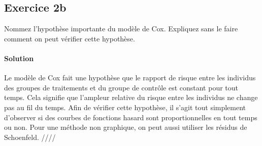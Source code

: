 \documentclass[../main.tex]{subfiles}
\begin{document}
\begin{CJK*}{UTF8}{gbsn}
    
\section*{Exercice 2b}
Nommez l'hypothèse importante du modèle de Cox. 
Expliquez sans le faire comment on peut vérifier cette hypothèse.
    
\paragraph{Solution}

Le modèle de Cox fait une hypothèse que 
le rapport de risque entre les individus des groupes 
de traitements et du groupe de contrôle
est constant pour tout temps.
Cela signifie que l'ampleur relative 
du risque entre les individus ne change pas au fil du temps.
Afin de vérifier cette hypothèse, il s'agit tout simplement d'observer si des courbes de 
fonctions hasard sont proportionnelles en tout temps ou non.
Pour une méthode non graphique, on peut aussi utiliser les résidus de Schoenfeld. ////

\end{CJK*}
\end{document}
